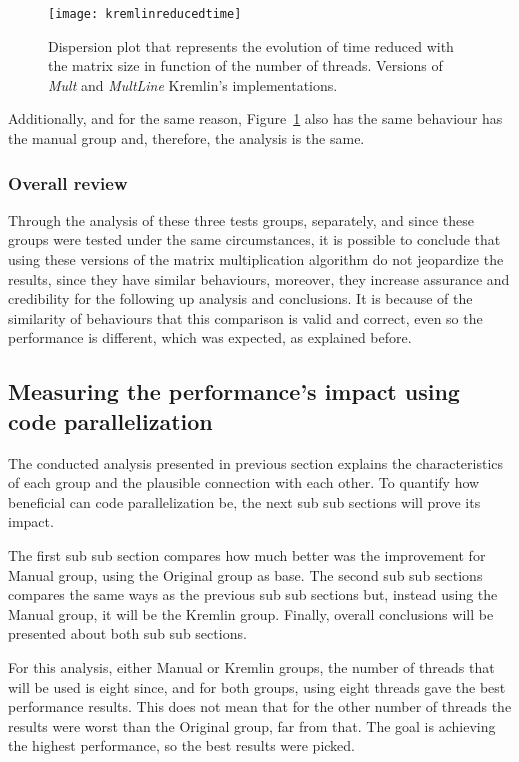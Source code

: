 \begin{figure}[htb]
	\begin{center}
		\leavevmode
		\texttt{[image: kremlinreducedtime]}
		\caption{Dispersion plot that represents the evolution of time reduced with the matrix size in function of the number of threads. Versions of \textit{Mult} and \textit{MultLine} Kremlin's implementations.}
		\label{fig:kremlinreducedtime}
	\end{center}
\end{figure}

Additionally, and for the same reason, Figure~\ref{fig:kremlinreducedtime} also has the same behaviour has the manual group and, therefore, the analysis is the same.

\subsubsection{Overall review}

Through the analysis of these three tests groups, separately, and since these groups were tested under the same circumstances, it is possible to conclude that using these versions of the matrix multiplication algorithm do not jeopardize the results, since they have similar behaviours, moreover, they increase assurance and credibility for the following up analysis and conclusions. It is because of the similarity of behaviours that this comparison is valid and correct, even so the performance is different, which was expected, as explained before.

\subsection{Measuring the performance's impact using code parallelization}

The conducted analysis presented in previous section explains the characteristics of each group and the plausible connection with each other. To quantify how beneficial can code parallelization be, the next sub sub sections will prove its impact. 

The first sub sub section compares how much better was the improvement for Manual group, using the Original group as base. The second sub sub sections compares the same ways as the previous sub sub sections but, instead using the Manual group, it will be the Kremlin group. Finally, overall conclusions will be presented about both sub sub sections. 

For this analysis, either Manual or Kremlin groups, the number of threads that will be used is eight since, and for both groups, using eight threads gave the best performance results. This does not mean that for the other number of threads the results were worst than the Original group, far from that. The goal is achieving the highest performance, so the best results were picked.

